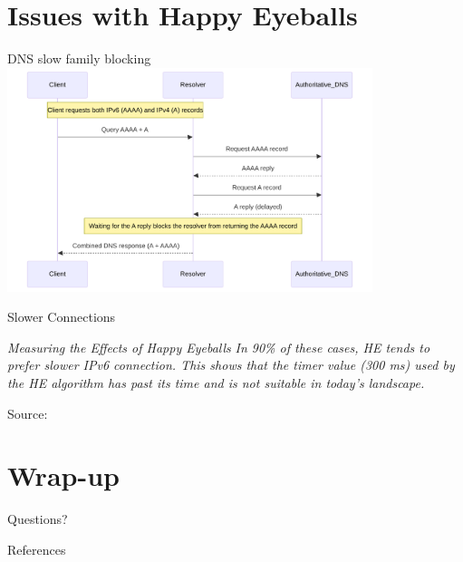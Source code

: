 \documentclass[aspectratio=169]{beamer}
\begin{document}
\section{Issues with Happy Eyeballs}
\begin{frame}{DNS slow family blocking}
  \centering
  \includegraphics[width=0.8\textwidth]{sfblocking.pdf}
\end{frame}

\begin{frame}{Slower Connections}
\begin{block}{\textit{Measuring the Effects of Happy Eyeballs}}
\vspace{0.5em}
\textit{In 90\% of these cases, HE
tends to prefer slower IPv6 connection. This shows that the timer
value (300 ms) used by the HE algorithm has past its time and is
not suitable in today’s landscape.}
\end{block}
  \centering
  {\tiny Source: \parencite{bajpaiMeasuringEffectsHappy2016}}
\end{frame}

\section{Wrap-up}
\begin{frame}
  \centering
  \vfill
  {\LARGE Questions?}
  \vfill
\end{frame}

\begin{frame}[allowframebreaks]{References}
  \printbibliography
\end{frame}
\end{document}

